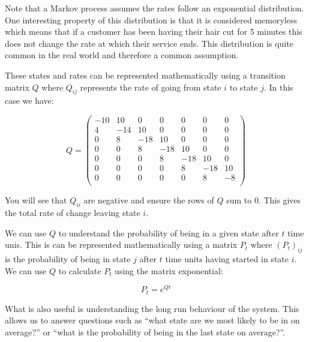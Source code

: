 Note that a Markov process assumes the rates follow an exponential distribution.
One interesting property of this distribution is that it is considered
memoryless which means that if a customer has been having their hair cut for 5
minutes this does not change the rate at which their service ends.
This distribution is quite common in the real world and therefore a common
assumption.

These states and rates can be represented mathematically using a transition
matrix \(Q\) where \(Q_{ij}\) represents the rate of going from state \(i\) to
state \(j\). In this case we have:

\begin{equation}
Q =
\begin{pmatrix}
-10 &  10 &   0 &   0 &   0 &   0 &   0\\
  4 & -14 &  10 &   0 &   0 &   0 &   0\\
  0 &   8 & -18 &  10 &   0 &   0 &   0\\
  0 &   0 &   8 & -18 &  10 &   0 &   0\\
  0 &   0 &   0 &   8 & -18 &  10 &   0\\
  0 &   0 &   0 &   0 &   8 & -18 &  10\\
  0 &   0 &   0 &   0 &   0 &   8 &  -8\\
 \end{pmatrix}
 \label{eqn:barber_shop_transition_matrix}
\end{equation}

You will see that \(Q_{ii}\) are negative and ensure the rows of \(Q\) sum to 0.
This gives the total rate of change leaving state \(i\).

We can use \(Q\) to understand the probability of being in a given state after
\(t\) time unis. This is can be represented mathematically using a matrix
\(P_{t}\) where \((P_{t})_{ij}\) is the probability of being in state \(j\)
after \(t\) time units having started in state \(i\). We can use \(Q\) to
calculate \(P_{t}\) using the matrix exponential:

\begin{equation}
    P_t = e^{Qt}
    \label{eqn:continuous_time_markov_process_matrix_exponential}
\end{equation}

What is also useful is understanding the long run behaviour of the
system. This allows us to answer questions such as ``what state are we most
likely to be in on average?'' or ``what is the probability of being in the last
state on average?''.

